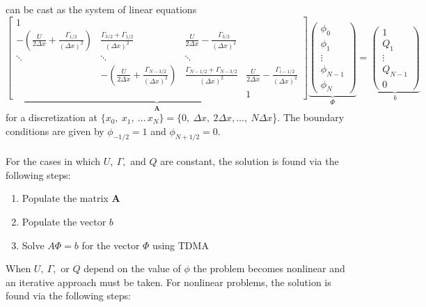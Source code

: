 \documentclass[reqno]{amsart}
\begin{document}
     can be cast as the system of linear equations
    \begin{equation*}
        \underbrace{\begin{bmatrix}
        1 \\
        -\left(\frac{U}{2\Delta x} + \frac{\Gamma_{1/2}}{(\Delta x)^2}\right) & \frac{\Gamma_{3/2}+\Gamma_{1/2}}{(\Delta x)^2} & \frac{U}{2\Delta x} - \frac{\Gamma_{3/2}}{(\Delta x)^2} \\
        \ddots & \ddots & \ddots \\
        & -\left(\frac{U}{2\Delta x} + \frac{\Gamma_{N - 3/2}}{(\Delta x)^2}\right) & \frac{\Gamma_{N - 1/2}+\Gamma_{N - 3/2}}{(\Delta x)^2} & \frac{U}{2\Delta x} - \frac{\Gamma_{i -1/2}}{(\Delta x)^2} \\
        &&& 1
\end{bmatrix}}_{\mathrm{\bm{A}}}
\underbrace{\begin{pmatrix} \phi_{0} \\ \phi_{1} \\ \vdots \\ \phi_{N-1} \\ \phi_{N} \end{pmatrix}}_{\Phi}
        =
        \underbrace{\begin{pmatrix} 1 \\ Q_1 \\ \vdots \\ Q_{N-1} \\ 0 \end{pmatrix}}_{b}
    \end{equation*}
    for a discretization at $\{x_0,\ x_1,\ \dots \, x_N\} = \{0,\ \Delta x,\ 2\Delta x,\dots,\ N\Delta x$\}.
    The boundary conditions are given by $\phi_{-1/2} = 1$ and $\phi_{N + 1/2} = 0$. \\~\\
    For the cases in which $U,\ \Gamma,$ and $Q$ are constant, the solution is found via the following steps:
    \begin{enumerate}
        \item Populate the matrix $\mathrm{\bm{A}}$
        \item Populate the vector $b$
        \item Solve $A\Phi = b$ for the vector $\Phi$ using TDMA
    \end{enumerate}
    When $U,\ \Gamma,$ or $Q$ depend on the value of $\phi$ the problem becomes nonlinear and an iterative approach must be taken.
    For nonlinear problems, the solution is found via the following steps:
\end{document}
